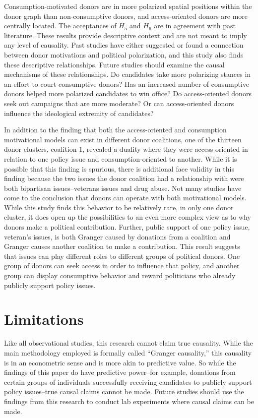 \documentclass[12pt,]{article}
\begin{document}
Consumption-motivated donors are in more polarized spatial positions
within the donor graph than non-consumptive donors, and access-oriented
donors are more centrally located. The acceptances of \(H_{5}\) and
\(H_{6}\) are in agreement with past literature. These results provide
descriptive context and are not meant to imply any level of causality.
Past studies have either suggested or found a connection between donor
motivations and political polarization, and this study also finds these
descriptive relationships. Future studies should examine the causal
mechanisms of these relationships. Do candidates take more polarizing
stances in an effort to court consumptive donors? Has an increased
number of consumptive donors helped more polarized candidates to win
office? Do access-oriented donors seek out campaigns that are more
moderate? Or can access-oriented donors influence the ideological
extremity of candidates?

In addition to the finding that both the access-oriented and consumption
motivational models can exist in different donor coalitions, one of the
thirteen donor clusters, coalition 1, revealed a duality where they were
access-oriented in relation to one policy issue and consumption-oriented
to another. While it is possible that this finding is spurious, there is
additional face validity in this finding because the two issues the
donor coalition had a relationship with were both bipartisan
issues--veterans issues and drug abuse. Not many studies have come to
the conclusion that donors can operate with both motivational models.
While this study finds this behavior to be relatively rare, in only one
donor cluster, it does open up the possibilities to an even more complex
view as to why donors make a political contribution. Further, public
support of one policy issue, veteran's issues, is both Granger caused by
donations from a coalition and Granger causes another coalition to make
a contribution. This result suggests that issues can play different
roles to different groups of political donors. One group of donors can
seek access in order to influence that policy, and another group can
display consumptive behavior and reward politicians who already publicly
support policy issues.

\hypertarget{limitations}{%
\section{Limitations}\label{limitations}}

Like all observational studies, this research cannot claim true
causality. While the main methodology employed is formally called
``Granger causality,'' this causality is in an econometric sense and is
more akin to predictive value. So while the findings of this paper do
have predictive power--for example, donations from certain groups of
individuals successfully receiving candidates to publicly support policy
issues--true causal claims cannot be made. Future studies should use the
findings from this research to conduct lab experiments where causal
claims can be made.
\end{document}
